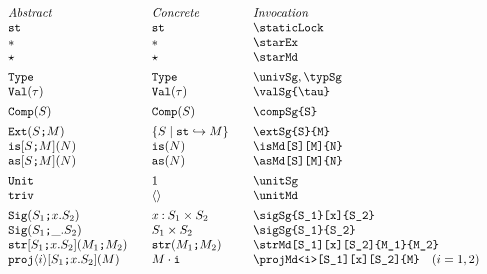 \documentclass[11pt]{article}
\begin{document}
\begin{figure}

  \begin{small}
    \begin{displaymath}
      \begin{array}{l@{\qquad}l@{\qquad}l@{\qquad}l}
        \textit{Abstract} & \textit{Concrete} & \textit{Invocation} \\
        \staticLock                    & \staticLock*         & \verb|\staticLock|                              \\
        \starEx                        & \starEx*             & \verb|\starEx|                                  \\
        \starMd                        & \starMd*             & \verb|\starMd|                                  \\[1ex]
        \univSg                        & \univSg*             & \verb|\univSg|, \verb|\typSg|                   \\
        \valSg{\tau}                   & \valSg*{\tau}        & \verb|\valSg{\tau}|                             \\[1ex]
        \compSg{S}                     & \compSg*{S}          & \verb|\compSg{S}|                               \\[1ex]
        \extSg{S}{M}                   & \extSg*{S}{M}        & \verb|\extSg{S}{M}|                             \\
        \isMd[S][M]{N}                 & \isMd*{N}            & \verb|\isMd[S][M]{N}|                          \\
        \asMd[S][M]{N}                & \asMd*{N}           & \verb|\asMd[S][M]{N}|                         \\[1ex]
        \unitSg                        & \unitSg*             & \verb|\unitSg|                                  \\
        \unitMd                        & \unitMd*             & \verb|\unitMd|                                  \\[1ex]
        \sigSg{S_1}[x]{S_2}            & \sigSg*{S_1}[x]{S_2} & \verb|\sigSg{S_1}[x]{S_2}|                      \\
        \sigSg{S_1}{S_2}               & \sigSg*{S_1}{S_2}    & \verb|\sigSg{S_1}{S_2}| \\
        \strMd[S_1][x][S_2]{M_1}{M_2}  & \strMd*{M_1}{M_2}    & \verb|\strMd[S_1][x][S_2]{M_1}{M_2}|            \\
        \projMd<i>[S_1][x][S_2]{M}     & \projMd*<i>{M}       & \verb|\projMd<i>[S_1][x][S_2]{M}| \quad (i=1,2) \\[1ex]

\end{array}
\end{displaymath}
\end{small}
\end{figure}
\end{document}
